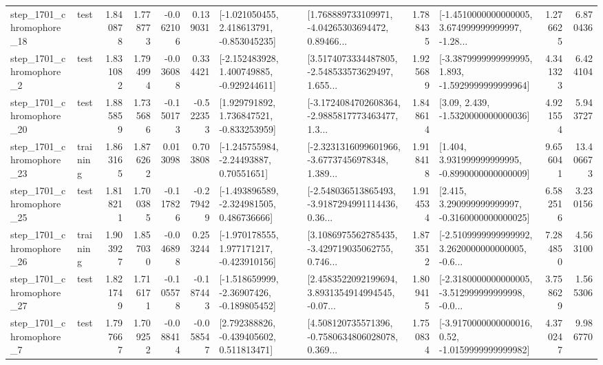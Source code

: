 \begin{tabular}{llrrrrllrlrr}
 step\_1701\_chromophore\_18 &      test &      1.840878 &    1.778773 &     -0.062106 &  0.139031 &   [-1.021050455, 2.418613791, -0.853045235] &  [1.768889733109971, -4.04265303694472, 0.89466... &       1.788435 &  [-1.4510000000000005, 3.674999999999997, -1.28... &            1.276625 &          6.870436 \\
  step\_1701\_chromophore\_2 &      test &      1.831082 &    1.794994 &     -0.036088 &  0.334421 &   [-2.152483928, 1.400749885, -0.929244611] &  [3.5174073334487805, -2.548533573629497, 1.655... &       1.925689 &  [-3.3879999999999995, 1.893, -1.5929999999999964] &            4.341323 &          6.424104 \\
 step\_1701\_chromophore\_20 &      test &      1.885859 &    1.735686 &     -0.150173 & -0.522353 &    [1.929791892, 1.736847521, -0.833253959] &  [-3.1724084702608364, -2.9885817773463477, 1.3... &       1.848614 &                 [3.09, 2.439, -1.5320000000000036] &            4.921554 &          5.943727 \\
 step\_1701\_chromophore\_23 &  training &      1.863165 &    1.876262 &      0.013098 &  0.703808 &     [-1.245755984, -2.24493887, 0.70551651] &  [-2.3231316099601966, -3.67737456978348, 1.389... &       1.918418 &    [1.404, 3.931999999999995, -0.8990000000000009] &            9.656041 &         13.406673 \\
 step\_1701\_chromophore\_25 &      test &      1.818211 &    1.700385 &     -0.117826 & -0.279429 &   [-1.493896589, -2.324981505, 0.486736666] &  [-2.548036513865493, -3.9187294991114436, 0.36... &       1.914534 &    [2.415, 3.290999999999997, -0.3160000000000025] &            6.582516 &          3.230156 \\
 step\_1701\_chromophore\_26 &  training &      1.903927 &    1.857030 &     -0.046898 &  0.253244 &   [-1.970178555, 1.977171217, -0.423910156] &  [3.1086975562785435, -3.429719035062755, 0.746... &       1.873512 &  [-2.5109999999999992, 3.2620000000000005, -0.6... &            7.284850 &          4.563100 \\
 step\_1701\_chromophore\_27 &      test &      1.821749 &    1.716171 &     -0.105578 & -0.187443 &   [-1.518659999, -2.36907426, -0.189805452] &  [2.4583522092199694, 3.8931354914994545, -0.07... &       1.809415 &  [-2.3180000000000005, -3.512999999999998, -0.0... &            3.758629 &          1.565306 \\
  step\_1701\_chromophore\_7 &      test &      1.797667 &    1.709252 &     -0.088414 & -0.058547 &    [2.792388826, -0.439405602, 0.511813471] &  [4.508120735571396, -0.7580634806028078, 0.369... &       1.750834 &   [-3.9170000000000016, 0.52, -1.0159999999999982] &            4.370247 &          9.986770 \\

\end{tabular}
